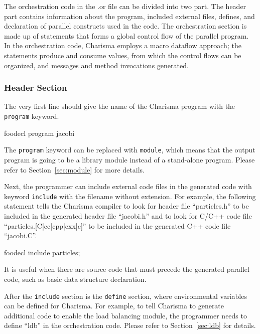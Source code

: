 
The orchestration code in the .or file can be divided into two part. The header
part contains information about the program, included external files, defines,
and declaration of parallel constructs used in the code. The orchestration
section is made up of statements that forms a global control flow of the
parallel program. In the orchestration code, Charisma employs a macro dataflow
approach; the statements produce and consume values, from which the control flows
can be organized, and messages and method invocations generated. 

\subsubsection{Header Section}

The very first line should give the name of the Charisma program with the {\tt
program} keyword.

\begin{SaveVerbatim}{foodecl}
    program jacobi 
\end{SaveVerbatim}

The {\tt program} keyword can be replaced with {\tt module}, which means that
the output program is going to be a library module instead of a stand-alone
program. Please refer to Section~\ref{sec:module} for more details.

Next, the programmer can include external code files in the generated code with
keyword {\tt include} with the filename without extension. For example, the
following statement tells the Charisma compiler to look for header file
``particles.h'' to be included in the generated header file ``jacobi.h'' and to
look for C/C++ code file ``particles.[C|cc|cpp|cxx|c]'' to be included in the
generated C++ code file ``jacobi.C''.

\begin{SaveVerbatim}{foodecl}
    include particles;
\end{SaveVerbatim}

It is useful when there are source code that must precede the generated
parallel code, such as basic data structure declaration. 

After the {\tt include} section is the {\tt define} section, where environmental
variables can be defined for Charisma. For example, to tell Charisma to generate
additional code to enable the load balancing module, the programmer needs to 
define ``ldb'' in the orchestration code. Please refer to Section~\ref{sec:ldb}
for details.

